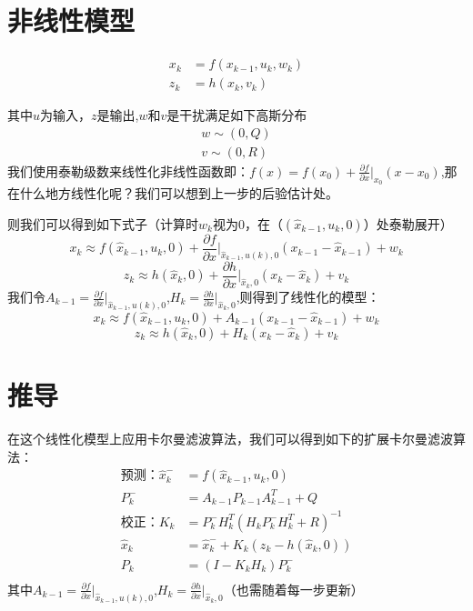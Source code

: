 \documentclass[12pt, a4paper, oneside]{ctexbook}
\begin{document}
\section{非线性模型}
\begin{align*}
    x_k&=f(x_{k-1},u_{k},w_{k})\\
    z_k&=h(x_k,v_k)
\end{align*}

其中$u$为输入，$z$是输出,$w$和$v$是干扰满足如下高斯分布
    \begin{align*}
        w\sim (0,Q)\\
        v\sim (0,R)
    \end{align*}
我们使用泰勒级数来线性化非线性函数即：$ f(x)=f(x_0)+\frac{\partial f}{\partial x}|_{x_0}(x-x_0) $,那在什么地方线性化呢？我们可以想到上一步的后验估计处。

则我们可以得到如下式子（计算时$w_{k}$视为0，在（$(\hat{x}_{k-1}, u_{k}, 0)$）处泰勒展开）
\begin{equation*}
    x_k \approx f(\hat{x}_{k-1}, u_{k}, 0) + \frac{\partial f}{\partial x}\bigg|_{\hat{x}_{k-1},u(k),0} (x_{k-1} - \hat{x}_{k-1}) + w_{k}
\end{equation*}
\begin{equation*}
    z_k \approx h(\hat{x}_k, 0) + \frac{\partial h}{\partial x}\bigg|_{\hat{x}_k,0} (x_k - \hat{x}_k) + v_k
\end{equation*}
我们令$A_{k-1}=\frac{\partial f}{\partial x}\bigg|_{\hat{x}_{k-1},u(k),0}$,$H_k=\frac{\partial h}{\partial x}\bigg|_{\hat{x}_k,0}$,则得到了线性化的模型：
\begin{equation*}
    x_k \approx f(\hat{x}_{k-1}, u_{k}, 0) + A_{k-1} (x_{k-1} - \hat{x}_{k-1}) + w_{k}
\end{equation*}
\begin{equation*}
    z_k \approx h(\hat{x}_k, 0) + H_k (x_k - \hat{x}_k) + v_k
\end{equation*}
\section{推导}
    在这个线性化模型上应用卡尔曼滤波算法，我们可以得到如下的扩展卡尔曼滤波算法：
    \begin{align*}
        \text{预测：}\hat{x}_k^-&=f(\hat{x}_{k-1}, u_k, 0)\\
        P_k^-&=A_{k-1}P_{k-1}A_{k-1}^T + Q\\
        \text{校正：}K_k&=P_k^-H_k^T(H_kP_k^-H_k^T + R)^{-1}\\
        \hat{x}_k&=\hat{x}_k^- + K_k(z_k - h(\hat{x}_k, 0))\\
        P_k&=(I - K_kH_k)P_k^-\\
    \end{align*}
其中$A_{k-1}=\frac{\partial f}{\partial x}\bigg|_{\hat{x}_{k-1},u(k),0}$,$H_k=\frac{\partial h}{\partial x}\bigg|_{\hat{x}_k,0}$（也需随着每一步更新）
\end{document}
